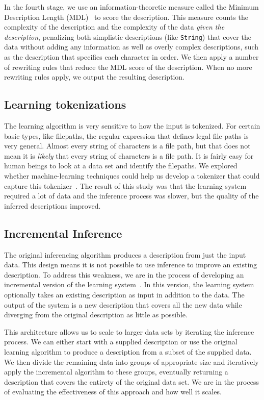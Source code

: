 \documentclass{sig-alternate}
\begin{document}
In the fourth stage, we use an information-theoretic measure called
the Minimum Description Length (MDL)~\cite{mdlbook} to score the
description.  This measure counts the complexity of the description
and the complexity of the data \textit{given the description},
penalizing both simplistic descriptions (like \texttt{String}) that
cover the data without adding any information as well as overly
complex descriptions, such as the description that specifies each
character in order.  We then apply a number of rewriting rules that
reduce the MDL score of the description.  When no more rewriting rules
apply, we output the resulting description.

\subsection{Learning tokenizations}
The learning algorithm is very sensitive to how the input is
tokenized.  For certain basic types, like filepaths, the regular
expression that defines legal file paths is very general.  Almost
every string of characters is a file path, but that does not mean it
is \textit{likely} that every string of characters is a file path.  It
is fairly easy for human beings to look at a data set and identify the
filepaths.  We explored whether machine-learning techniques could help
us develop a tokenizer that could capture this
tokenizer~\cite{Xi+:padl}. The result of this study was that the
learning system required a lot of data and the inference process was
slower, but the quality of the inferred descriptions improved.

\subsection{Incremental Inference}
The original inferencing algorithm produces a description from just
the input data.  This design means it is not possible to use inference
to improve an existing description.  To address this weakness, we
are in the process of developing an incremental version of the
learning system~\cite{Zhu+:wasl}.  In this version, the learning system optionally
takes an existing description as input in addition to the data.
The output of the system is a new description that covers all the new
data while diverging from the original description as little as
possible.  

This architecture allows us to scale to larger data sets by
iterating the inference process.  We can either start with a supplied
description or use the original learning algorithm to produce a
description from a subset of the supplied data.  We then divide the
remaining data into groups of appropriate size and iteratively apply
the incremental algorithm to these groups, eventually returning a
description that covers the entirety of the original data set.
We are in the process of evaluating the effectiveness of this approach
and how well it scales.
\end{document}
